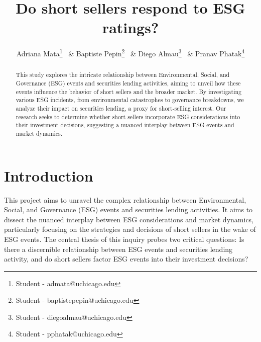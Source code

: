 \newcommand*{\MyHeaderPath}{.}%
\newcommand*{\PathToAssets}{../assets}%
\newcommand*{\PathToOutput}{../output/}%
\newcommand*{\PathToOutputTables}{../output/tables}%








\title{
Do short sellers respond to ESG ratings?
}

\author{
Adriana Mata\footnote{Student - admata@uchicago.edu} \ \& Baptiste Pepin\footnote{Student - baptistepepin@uchicago.edu} \ \& Diego Almau\footnote{Student - diegoalmau@uchicago.edu} \ \& Pranav Phatak\footnote{Student - pphatak@uchicago.edu}
}

\begin{titlepage}
\maketitle

\doublespacing
\begin{abstract}
This study explores the intricate relationship between Environmental, Social, and Governance (ESG) events and securities lending activities, aiming to unveil how these events influence the behavior of short sellers and the broader market. By investigating various ESG incidents, from environmental catastrophes to governance breakdowns, we analyze their impact on securities lending, a proxy for short-selling interest. Our research seeks to determine whether short sellers incorporate ESG considerations into their investment decisions, suggesting a nuanced interplay between ESG events and market dynamics.
\end{abstract}

\end{titlepage}

\doublespacing
\section{Introduction}

This project aims to unravel the complex relationship between Environmental, Social, and Governance (ESG) events and securities lending activities. It aims to dissect the nuanced interplay between ESG considerations and market dynamics, particularly focusing on the strategies and decisions of short sellers in the wake of ESG events. The central thesis of this inquiry probes two critical questions: Is there a discernible relationship between ESG events and securities lending activity, and do short sellers factor ESG events into their investment decisions?

